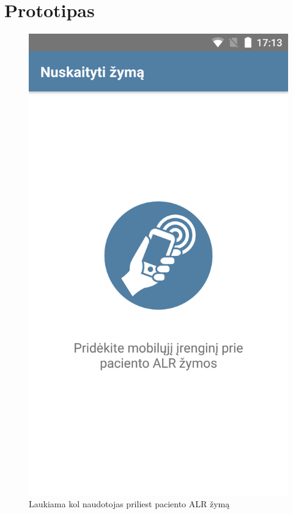 \documentclass{VUMIFPSbakalaurinis}
\begin{document}
\tableofcontents















\printbibliography[heading=bibintoc]  


\appendix 
\section{Prototipas}

\begin{figure}[H]
    \centering
    \includegraphics[scale=0.15]{images/prototype-3}
    \caption{Laukiama kol naudotojas priliest paciento ALR žymą} 
\end{figure}
\end{document}
